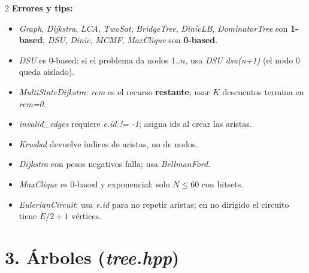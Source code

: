 \documentclass[10pt]{article}
\begin{document}
\begin{multicols}{2}
\textbf{Errores y tips:}
\begin{itemize}\setlength{\itemsep}{1pt}
  \item \textit{Graph}, \textit{Dijkstra}, \textit{LCA}, \textit{TwoSat}, \textit{BridgeTree}, \textit{DinicLB}, \textit{DominatorTree} son \textbf{1-based}; \textit{DSU}, \textit{Dinic}, \textit{MCMF}, \textit{MaxClique} son \textbf{0-based}.
  \item \textit{DSU} es 0-based: si el problema da nodos $1..n$, usa \textit{DSU dsu(n+1)} (el nodo 0 queda aislado).
  \item \textit{MultiStateDijkstra}: \textit{rem} es el recurso \textbf{restante}; usar $K$ descuentos termina en \textit{rem=0}.
  \item \textit{invalid\_edges} requiere \textit{e.id != -1}; asigna ids al crear las aristas.
  \item \textit{Kruskal} devuelve índices de aristas, no de nodos.
  \item \textit{Dijkstra} con pesos negativos falla; usa \textit{BellmanFord}.
  \item \textit{MaxClique} es 0-based y exponencial: solo $N \le 60$ con bitsets.
  \item \textit{EulerianCircuit}: usa \textit{e.id} para no repetir aristas; en no dirigido el circuito tiene $E/2+1$ vértices.
\end{itemize}

\section*{3. Árboles (\textit{tree.hpp})}


\end{multicols}
\end{document}
